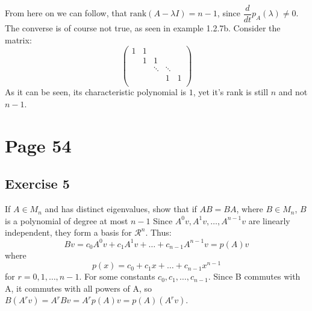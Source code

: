 From here on we can follow, that $\text{rank} (A- \lambda I) = n-1$, since $\dfrac{d}{dt} p_{A}(\lambda) \neq 0$.
The converse is of course not true, as seen in example 1.2.7b. Consider the matrix:
\begin{equation}
\left( \begin{array}{ccccc}
1&1 & & &  \\
& 1&1 & & \\
& & \ddots& \ddots & \\
& &  & 1 & 1\\
\end{array} \right)
\end{equation}
As it can be seen, its characteristic polynomial is $1$, yet it's rank is still $n$ and not $n-1$.
\section{Page 54}
\subsection{Exercise 5}
If $A \in M_n$ and has distinct eigenvalues, show that if $AB = BA$, where $B \in M_n$, $B$ is a polynomial of degree at most $n-1$
Since $A^0 v,A^1 v,\ldots,A^{n-1} v$ are linearly independent, they form a basis for $\mathcal{R}^n$. Thus:
\begin{equation*}
Bv=c_0 A^0 v+c_1 A^1 v+\ldots+c_{n-1} A^{n-1} v=p(A)v
\end{equation*}
where 
\begin{equation*}
p(x)=c_0+c_1 x +\ldots+c_{n-1}x^{n-1}
\end{equation*}
for $r = 0,1,\ldots ,n-1$.
For some constants $c_0,c_1,\ldots,c_{n−1}$. Since B commutes with A, it commutes with all powers of A, so $B(A^r v)=A^r Bv=A^r p(A)v= p(A)(A^r v)$.

